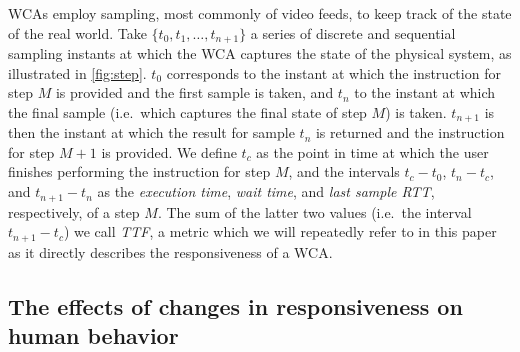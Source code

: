 \acp{WCA} employ sampling, most commonly of video feeds, to keep track of the state of the real world.
Take \( \{ t_0, t_1, \ldots, t_{n + 1} \} \) a series of discrete and sequential sampling instants at which the \ac{WCA} captures the state of the physical system, as illustrated in \cref{fig:step}.
\( t_0 \) corresponds to the instant at which the instruction for step \( M \) is provided and the first sample is taken, and \( t_n \) to the instant at which the final sample (i.e.\ which captures the final state of step \( M \)) is taken. 
\( t_{n + 1} \) is then the instant at which the result for sample \( t_n \) is returned and the instruction for step \( M + 1 \) is provided.
We define \( t_c \) as the point in time at which the user finishes performing the instruction for step \( M \), and the intervals \( t_c - t_0 \), \( t_n - t_c \), and \( t_{n + 1} - t_n \) as the \emph{execution time}, \emph{wait time}, and \emph{last sample \ac{RTT}}, respectively, of a step \( M \).
The sum of the latter two values (i.e.\ the interval \( t_{n + 1} - t_c \)) we call \emph{\ac{TTF}}, a metric which we will repeatedly refer to in this paper as it directly describes the responsiveness of a \ac{WCA}.



\subsection{The effects of changes in responsiveness on human behavior}\label{ssec:plos}


